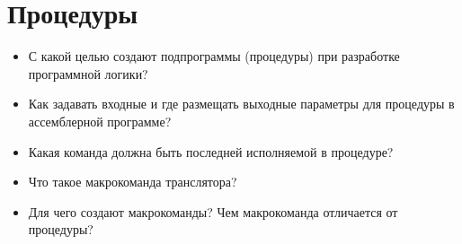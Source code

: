 \chapter{Процедуры}
\begin{itemize}
\item С какой целью создают подпрограммы (процедуры) при разработке программной логики?
\item Как задавать входные и где размещать выходные параметры для процедуры в ассемблерной программе?
\item Какая команда должна быть последней исполняемой в процедуре?
\item Что такое макрокоманда транслятора?
\item Для чего создают макрокоманды? Чем макрокоманда отличается от процедуры?
\end{itemize}
\endinput